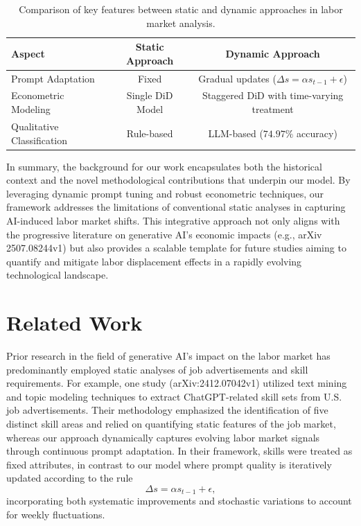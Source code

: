 \documentclass{article}
\begin{document}
\begin{table}[h]
\centering
\begin{tabular}{lcc}
\hline
\textbf{Aspect} & \textbf{Static Approach} & \textbf{Dynamic Approach} \\
\hline
Prompt Adaptation & Fixed & Gradual updates (\(\Delta s = \alpha s_{t-1} + \epsilon\)) \\
Econometric Modeling & Single DiD Model & Staggered DiD with time-varying treatment \\
Qualitative Classification & Rule-based & LLM-based (\(74.97\%\) accuracy) \\
\hline
\end{tabular}
\caption{Comparison of key features between static and dynamic approaches in labor market analysis.}
\label{tab:comparison}
\end{table}

In summary, the background for our work encapsulates both the historical context and the novel methodological contributions that underpin our model. By leveraging dynamic prompt tuning and robust econometric techniques, our framework addresses the limitations of conventional static analyses in capturing AI-induced labor market shifts. This integrative approach not only aligns with the progressive literature on generative AI’s economic impacts (e.g., arXiv 2507.08244v1) but also provides a scalable template for future studies aiming to quantify and mitigate labor displacement effects in a rapidly evolving technological landscape.

\section{Related Work}
Prior research in the field of generative AI’s impact on the labor market has predominantly employed static analyses of job advertisements and skill requirements. For example, one study (arXiv:2412.07042v1) utilized text mining and topic modeling techniques to extract ChatGPT-related skill sets from U.S. job advertisements. Their methodology emphasized the identification of five distinct skill areas and relied on quantifying static features of the job market, whereas our approach dynamically captures evolving labor market signals through continuous prompt adaptation. In their framework, skills were treated as fixed attributes, in contrast to our model where prompt quality is iteratively updated according to the rule 
\[
\Delta s = \alpha s_{t-1} + \epsilon,
\]
incorporating both systematic improvements and stochastic variations to account for weekly fluctuations.
\end{document}
